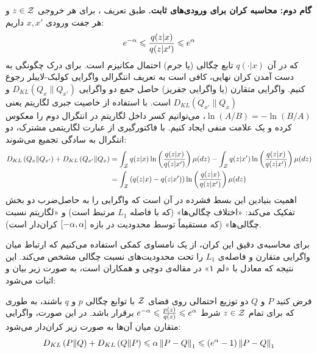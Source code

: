 \begin{اثبات}
\textbf{گام دوم: محاسبه کران برای ورودی‌های ثابت.}
طبق تعریف \LDP، برای هر خروجی $z \in \Zset$ و هر جفت ورودی $x, x'$ داریم:
\begin{equation}
e^{-\alpha} \leqslant \frac{q(z|x)}{q(z|x')} \leqslant e^{\alpha}
\end{equation}
که در آن $q(\cdot|x)$ تابع چگالی (یا جرم) احتمال مکانیزم است. برای درک چگونگی به دست آمدن کران نهایی، کافی است به تعریف انتگرالی واگرایی کولبک-لایبلر رجوع کنیم. واگرایی متقارن (یا واگرایی جفریز) حاصل جمع دو واگرایی $D_{KL}\left(Q_x \| Q_{x'}\right)$ و $D_{KL}\left(Q_{x'} \| Q_x\right)$ است. با استفاده از خاصیت جبری لگاریتم یعنی $\ln(A/B) = -\ln(B/A)$، می‌توانیم کسر داخل لگاریتم در انتگرال دوم را معکوس کرده و یک علامت منفی ایجاد کنیم. با فاکتورگیری از عبارت لگاریتمی مشترک، دو انتگرال به سادگی تجمیع می‌شوند:
\begin{align}
D_{KL}\left(Q_x \| Q_{x'}\right) + D_{KL}\left(Q_{x'} \| Q_x\right) &= \int_{\Zset} q(z|x) \ln\left( \frac{q(z|x)}{q(z|x')} \right) \mu(dz) - \int_{\Zset} q(z|x') \ln\left( \frac{q(z|x)}{q(z|x')} \right) \mu(dz) \nonumber \\
&= \int_{\Zset} \left( q(z|x) - q(z|x') \right) \ln\left( \frac{q(z|x)}{q(z|x')} \right) \mu(dz)
\end{align}
اهمیت بنیادین این بسط فشرده در آن است که واگرایی را به حاصل‌ضرب دو بخش تفکیک می‌کند: «اختلاف چگالی‌ها» (که با فاصله $L_1$ مرتبط است) و «لگاریتم نسبت چگالی‌ها» (که مستقیماً توسط محدودیت \LDP در بازه $\left[-\alpha, \alpha\right]$ کران‌دار است).

برای محاسبه‌ی دقیق این کران، از یک نامساوی کمکی استفاده می‌کنیم که ارتباط میان واگرایی متقارن و فاصله‌ی $L_1$ را تحت محدودیت‌های نسبت چگالی مشخص می‌کند. این نتیجه که معادل با «لم ۱» در مقاله‌ی دوچی و همکاران \cite{Duchi2013} است، به صورت زیر بیان و اثبات می‌شود:

\begin{لم}
\label{lem:duchi-jeffreys}
فرض کنید $P$ و $Q$ دو توزیع احتمالی روی فضای $\Zset$ با توابع چگالی $p$ و $q$ باشند، به طوری که برای تمام $z \in \Zset$ شرط $e^{-\alpha} \leqslant \frac{p(z)}{q(z)} \leqslant e^{\alpha}$ برقرار باشد. در این صورت، واگرایی متقارن میان آن‌ها به صورت زیر کران‌دار می‌شود:
\begin{equation}
\label{eq:duchi-lemma1}
D_{KL}\left(P \| Q\right) + D_{KL}\left(Q \| P\right) \leqslant \alpha \left\lVert P - Q\right\rVert_1 \leqslant \left(e^{\alpha} - 1\right) \left\lVert P - Q\right\rVert_1
\end{equation}
\end{لم}


\end{اثبات}
